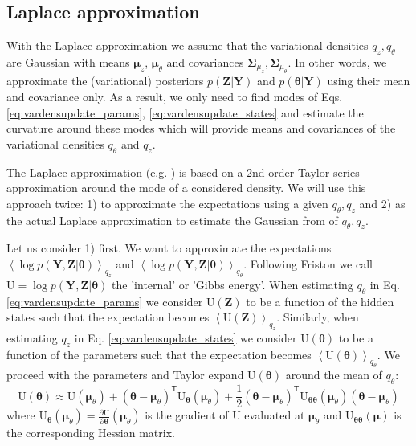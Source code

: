 \documentclass[a4paper,10pt]{article}
\newcommand{\bs}[1]{\mathbf{#1}}					%
\newcommand{\bgs}[1]{\boldsymbol{#1}}				%
\newcommand{\pd}[2]{\frac{\partial #1}{\partial #2}} 	%
\newcommand{\tr}{\mathsf{T}}				%
\newcommand{\eq}[1]{\begin{equation} #1 \end{equation}}%
\renewcommand{\ss}{z}         %
\newcommand{\spm}{\mu}    %
\renewcommand{\sp}{\theta}    %
\newcommand{\ppm}{\bgs{\spm}}   %
\newcommand{\pp}{\bgs{\sp}} %
\newcommand{\Ps}{\bs{Z}}    %
\newcommand{\Po}{\bs{Y}}    %
\newcommand{\E}[2][]{\left\langle #2 \right\rangle_{#1}}	%
\newcommand{\U}{\mathrm{U}}			%
\newcommand{\Cov}{\bgs{\Sigma}}			%
\begin{document}
\subsection{Laplace approximation}
With the Laplace approximation we assume that the variational densities $q_{\ss}, q_{\sp}$ are Gaussian with means $\ppm_{\ss}$, $\ppm_{\sp}$ and covariances $\Cov_{\spm_\ss}, \Cov_{\spm_\sp}$. In other words, we approximate the (variational) posteriors $p(\Ps|\Po)$ and $p(\pp|\Po)$ using their mean and covariance only. As a result, we only need to find modes of Eqs. \ref{eq:vardensupdate_params}, \ref{eq:vardensupdate_states} and estimate the curvature around these modes which will provide means and covariances of the variational densities $q_\sp$ and $q_\ss$.

The Laplace approximation (e.g. \cite[p. 255]{Murphy2012}) is based on a 2nd order Taylor series approximation around the mode of a considered density. We will use this approach twice: 1) to approximate the expectations using a given $q_\sp, q_\ss$ and 2) as the actual Laplace approximation to estimate the Gaussian from of $q_\sp, q_\ss$.

Let us consider 1) first. We want to approximate the expectations $\E[q_\ss]{\log p(\Po,\Ps|\pp)}$ and $\E[q_\sp]{\log p(\Po,\Ps|\pp)}$. Following Friston we call $\U = \log p(\Po,\Ps|\pp)$ the 'internal' or 'Gibbs energy'. When estimating $q_\sp$ in Eq. \ref{eq:vardensupdate_params} we consider $\U(\Ps)$ to be a function of the hidden states such that the expectation becomes $\E[q_\ss]{\U(\Ps)}$. Similarly, when estimating $q_\ss$ in Eq. \ref{eq:vardensupdate_states} we consider $\U(\pp)$ to be a function of the parameters such that the expectation becomes $\E[q_\sp]{\U(\pp)}$. We proceed with the parameters and Taylor expand $\U(\pp)$ around the mean of $q_\sp$:
\eq{
    \U(\pp) \approx \U(\ppm_\sp) + (\pp - \ppm_\sp)^\tr \U_{\pp}(\ppm_\sp) + \frac{1}{2}(\pp - \ppm_\sp)^\tr \U_{\pp\pp}(\ppm_\sp) (\pp - \ppm_\sp)
}
where $\U_{\pp}(\ppm_\sp) = \pd{\U}{\pp}(\ppm_\sp)$ is the gradient of $\U$ evaluated at $\ppm_\sp$ and $\U_{\pp\pp}(\ppm)$ is the corresponding Hessian matrix.
\end{document}
